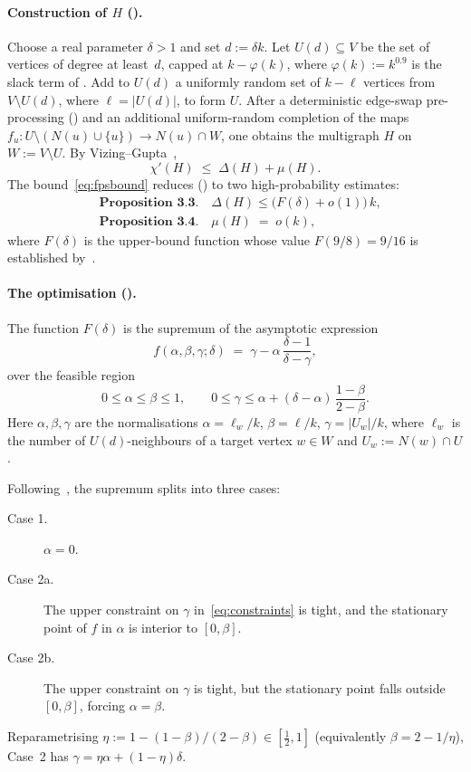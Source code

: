 \documentclass[11pt,a4paper]{article}
\theoremstyle{definition}
\newcommand{\chip}{\chi'}
\begin{document}
\paragraph{Construction of $H$ (\cite[\S 3]{FPS}).}
Choose a real parameter $\delta>1$ and set $d:=\delta k$. Let
$U(d)\subseteq V$ be the set of vertices of degree at least~$d$, capped
at $k-\varphi(k)$, where $\varphi(k):=k^{0.9}$ is the slack term of
\cite[Footnote 1, p.~6]{FPS}. Add to $U(d)$ a uniformly random set of
$k-\ell$ vertices from $V\setminus U(d)$, where $\ell=|U(d)|$, to form
$U$. After a deterministic edge-swap pre-processing
(\cite[p.~7--8]{FPS}) and an additional uniform-random completion of
the maps $f_u\colon U\setminus(N(u)\cup\{u\})\to N(u)\cap W$, one
obtains the multigraph $H$ on $W:=V\setminus U$. By
Vizing--Gupta~\cite[Lem.~2.2(ii)]{FPS},
\begin{equation}\label{eq:VG}
  \chip(H)\;\le\;\Delta(H)+\mu(H).
\end{equation}
The bound~\eqref{eq:fpsbound} reduces (\cite[\S 3]{FPS}) to two
high-probability estimates:
\begin{align}
  &\textbf{Proposition 3.3.}\quad
  \Delta(H)\le \bigl(F(\delta)+o(1)\bigr)\,k,\label{eq:prop33}\\[2pt]
  &\textbf{Proposition 3.4.}\quad
  \mu(H)\;=\;o(k),\label{eq:prop34}
\end{align}
where $F(\delta)$ is the upper-bound function whose value $F(9/8)=9/16$
is established by~\cite[Claim 3.7]{FPS}.

\paragraph{The optimisation (\cite[Claim 3.7]{FPS}).}
The function $F(\delta)$ is the supremum of the asymptotic
expression
\begin{equation}\label{eq:obj}
   f(\alpha,\beta,\gamma;\delta)
   \;=\;
   \gamma - \alpha\,\frac{\delta-1}{\delta-\gamma},
\end{equation}
over the feasible region
\begin{equation}\label{eq:constraints}
   0\le\alpha\le\beta\le 1,
   \qquad
   0\le\gamma\le\alpha+(\delta-\alpha)\,\frac{1-\beta}{2-\beta}.
\end{equation}
Here $\alpha,\beta,\gamma$ are the normalisations
$\alpha=\ell_w/k$, $\beta=\ell/k$, $\gamma=|U_w|/k$,
where $\ell_w$ is the number of $U(d)$-neighbours of a target vertex
$w\in W$ and $U_w:=N(w)\cap U$.

Following~\cite[Proof of Claim 3.7]{FPS}, the supremum splits into
three cases:
\begin{description}
\item[Case 1.] $\alpha=0$.
\item[Case 2a.] The upper constraint on $\gamma$
  in~\eqref{eq:constraints} is tight, and the stationary point of $f$
  in $\alpha$ is interior to $[0,\beta]$.
\item[Case 2b.] The upper constraint on $\gamma$ is tight, but the
  stationary point falls outside $[0,\beta]$, forcing $\alpha=\beta$.
\end{description}
Reparametrising $\eta:=1-(1-\beta)/(2-\beta)\in[\tfrac12,1]$
(equivalently $\beta=2-1/\eta$), Case~2 has
$\gamma=\eta\alpha+(1-\eta)\delta$.
\end{document}
